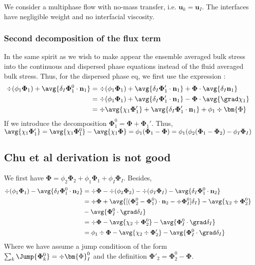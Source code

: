 
We consider a multiphase flow with no-mass transfer, i.e. $\textbf{u}_k=\textbf{u}_I$.
The interfaces have negligible weight and no interfacial viscosity. 



\subsubsection{Second decomposition of the flux term}
In the same spirit as \citet{chu2016flux} we wish to make appear the ensemble averaged bulk stress into the continuous and dispersed phase equations instead of the fluid averaged bulk stress. 
Thus, for the dispersed phase eq, we first use the expression :
\begin{align*}
    \div  (\phi_1 \mathbf{\Phi}_1)
    + \avg{\delta_I \mathbf{\Phi}_1^0 \cdot \textbf{n}_1}
    &=
    \div  (\phi_1 \mathbf{\Phi}_1)
    + \avg{\delta_I \mathbf{\Phi}_1' \cdot \textbf{n}_1}
    + \mathbf{\Phi} \cdot  \avg{\delta_I \textbf{n}_1}\\
    &=
    \div  (\phi_1 \mathbf{\Phi}_1)
    + \avg{\delta_I \mathbf{\Phi}_1' \cdot \textbf{n}_1}
    - \mathbf{\Phi} \cdot  \avg{\grad\chi_1}\\
    &=
    \div  \avg{\chi_1 \mathbf{\Phi}_1'}
    + \avg{\delta_I \mathbf{\Phi}_1' \cdot \textbf{n}_1}
    + \phi_1 \div \bm{\Phi}\\
\end{align*}
If we introduce the decomposition  $\mathbf{\Phi}_1^0 =  \mathbf{\Phi} + \mathbf{\Phi}_1'$.
Thus, $\avg{\chi_1\mathbf{\Phi}_1'} 
= \avg{\chi_1 \mathbf{\Phi}_1^0} - \avg{\chi_1\mathbf{\Phi}}
= \phi_1 (\mathbf{\Phi}_1 - \mathbf{\Phi})
= \phi_1 ( \phi_2 (\mathbf{\Phi}_1  -  \mathbf{\Phi}_2)  - \phi_I \mathbf{\Phi}_I )$
\subsection{Chu et al derivation is not good}
We first have $\bm{\Phi} = \phi_2 \bm{\Phi}_2+\phi_1 \bm{\Phi}_1 + \phi_I \bm{\Phi}_I$. 
Besides,
\begin{align*}
    \div  (\phi_1 \mathbf{\Phi}_1)
    - \avg{\delta_I \mathbf{\Phi}_1^0 \cdot \textbf{n}_2}
    &=
    \div  \mathbf{\Phi}
    - \div  (\phi_2\mathbf{\Phi}_2)
    - \div  (\phi_I\mathbf{\Phi}_I)
    - \avg{\delta_I \mathbf{\Phi}_1^0 \cdot \textbf{n}_2}\\
    &=
    \div  \mathbf{\Phi}
    + \avg{ [(\mathbf{\Phi}_2^0 - \mathbf{\Phi}_1^0) \cdot \textbf{n}_2 - \div \mathbf{\Phi}_I^0]\delta_I}
    - \avg{ \chi_2 \div \mathbf{\Phi}_2^0  }\\
    &- \avg{ \mathbf{\Phi}_I^0  \cdot \grad\delta_I}
    \\
    &=
    \div  \mathbf{\Phi}
    - \avg{ \chi_2 \div \mathbf{\Phi}_2^0  }
    - \avg{ \mathbf{\Phi}_I^0  \cdot \grad\delta_I}
    \\
    &=
    \phi_1 \div  \mathbf{\Phi}
    - \avg{ \chi_2 \div \mathbf{\Phi}_2'  }
    - \avg{ \mathbf{\Phi}_I^0  \cdot \grad\delta_I}
    \\
\end{align*}
Where we have assume a jump conditioon of the form $\sum_k \Jump{\mathbf{\Phi}_k^0} = \div \bm{\Phi}_I^0$ and the definition $\bm{\Phi}'_2 = \bm{\Phi}_2^0 - \bm{\Phi}$.


